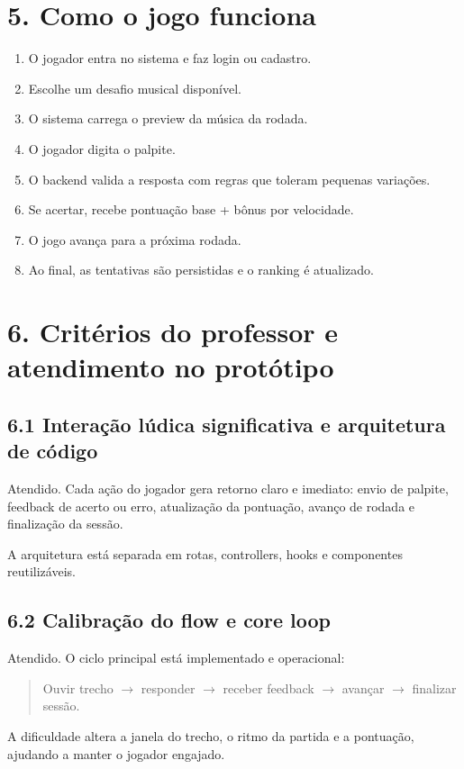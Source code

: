 \documentclass[12pt,a4paper]{article}
\begin{document}
\section*{5. Como o jogo funciona}
\begin{enumerate}[leftmargin=1.4em]
  \item O jogador entra no sistema e faz login ou cadastro.
  \item Escolhe um desafio musical disponível.
  \item O sistema carrega o preview da música da rodada.
  \item O jogador digita o palpite.
  \item O backend valida a resposta com regras que toleram pequenas variações.
  \item Se acertar, recebe pontuação base + bônus por velocidade.
  \item O jogo avança para a próxima rodada.
  \item Ao final, as tentativas são persistidas e o ranking é atualizado.
\end{enumerate}

\section*{6. Critérios do professor e atendimento no protótipo}
\subsection*{6.1 Interação lúdica significativa e arquitetura de código}
Atendido. Cada ação do jogador gera retorno claro e imediato: envio de palpite, feedback de acerto ou erro, atualização da pontuação, avanço de rodada e finalização da sessão.

A arquitetura está separada em rotas, controllers, hooks e componentes reutilizáveis.

\subsection*{6.2 Calibração do flow e core loop}
Atendido. O ciclo principal está implementado e operacional:
\begin{quote}
Ouvir trecho $\rightarrow$ responder $\rightarrow$ receber feedback $\rightarrow$ avançar $\rightarrow$ finalizar sessão.
\end{quote}

A dificuldade altera a janela do trecho, o ritmo da partida e a pontuação, ajudando a manter o jogador engajado.
\end{document}
